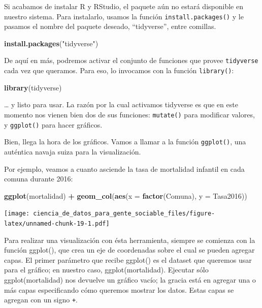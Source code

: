 \documentclass[spanish,]{book}
\newenvironment{Shaded}{\begin{snugshade}}{\end{snugshade}}
\newcommand{\DataTypeTok}[1]{\textcolor[rgb]{0.13,0.29,0.53}{#1}}
\newcommand{\KeywordTok}[1]{\textcolor[rgb]{0.13,0.29,0.53}{\textbf{#1}}}
\newcommand{\NormalTok}[1]{#1}
\newcommand{\OperatorTok}[1]{\textcolor[rgb]{0.81,0.36,0.00}{\textbf{#1}}}
\newcommand{\StringTok}[1]{\textcolor[rgb]{0.31,0.60,0.02}{#1}}
\begin{document}
Si acabamos de instalar R y RStudio, el paquete aún no estará disponible en nuestro sistema. Para instalarlo, usamos la función \texttt{install.packages()} y le pasamos el nombre del paquete deseado, ``tidyverse'', entre comillas.

\begin{Shaded}
\begin{Highlighting}[]
\KeywordTok{install.packages}\NormalTok{(}\StringTok{"tidyverse"}\NormalTok{)}
\end{Highlighting}
\end{Shaded}

De aquí en más, podremos activar el conjunto de funciones que provee \texttt{tidyverse} cada vez que queramos. Para eso, lo invocamos con la función \texttt{library()}:

\begin{Shaded}
\begin{Highlighting}[]
\KeywordTok{library}\NormalTok{(tidyverse)}
\end{Highlighting}
\end{Shaded}

\ldots{} y listo para usar. La razón por la cual activamos tidyverse es que en este momento nos vienen bien dos de sus funciones: \texttt{mutate()} para modificar valores, y \texttt{ggplot()} para hacer gráficos.

Bien, llega la hora de los gráficos. Vamos a llamar a la función \texttt{ggplot()}, una auténtica navaja suiza para la visualización.

Por ejemplo, veamos a cuanto asciende la tasa de mortalidad infantil en cada comuna durante 2016:

\begin{Shaded}
\begin{Highlighting}[]
\KeywordTok{ggplot}\NormalTok{(mortalidad) }\OperatorTok{+}
\StringTok{    }\KeywordTok{geom_col}\NormalTok{(}\KeywordTok{aes}\NormalTok{(}\DataTypeTok{x =} \KeywordTok{factor}\NormalTok{(Comuna), }\DataTypeTok{y =}\NormalTok{ Tasa2016))}
\end{Highlighting}
\end{Shaded}

\texttt{[image: ciencia\_de\_datos\_para\_gente\_sociable\_files/figure-latex/unnamed-chunk-19-1.pdf]}

Para realizar una visualización con ésta herramienta, siempre se comienza con la función ggplot(), que crea un eje de coordenadas sobre el cual se pueden agregar capas. El primer parámetro que recibe ggplot() es el dataset que queremos usar para el gráfico; en nuestro caso, ggplot(mortalidad). Ejecutar sólo ggplot(mortalidad) nos devuelve un gráfico vacío; la gracia está en agregar una o más capas especificando cómo queremos mostrar los datos. Estas capas se agregan con un signo \texttt{+}.
\end{document}
